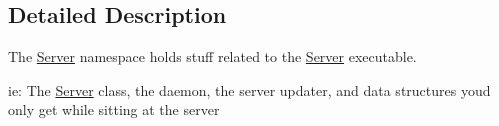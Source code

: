 \subsection{Detailed Description}
The \hyperlink{namespaceAsteroids_1_1Domain_1_1Server}{Server} namespace holds stuff related to the \hyperlink{namespaceAsteroids_1_1Domain_1_1Server}{Server} executable. 

ie\+: The \hyperlink{namespaceAsteroids_1_1Domain_1_1Server}{Server} class, the daemon, the server updater, and data structures you\textquotesingle{}d only get while sitting at the server 